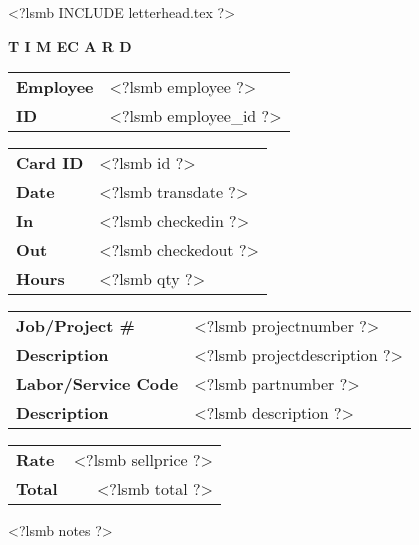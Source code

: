 \documentclass{scrartcl}
\begin{document}
\pagestyle{myheadings}
\thispagestyle{empty}

\fontsize{10pt}{12pt}\selectfont

<?lsmb INCLUDE letterhead.tex ?>

\centerline{\textbf{T I M E}\hspace{0.5cm}\textbf{C A R D}}

\vspace*{0.5cm}

\begin{tabular}[t]{ll}
  \textbf{Employee} & <?lsmb employee ?> \\
  \textbf{ID} & <?lsmb employee_id ?> \\
\end{tabular}
\hfill
\begin{tabular}[t]{ll}
  \textbf{Card ID} & <?lsmb id ?> \\
  \textbf{Date} & <?lsmb transdate ?> \\
  \textbf{In} & <?lsmb checkedin ?> \\
  \textbf{Out} & <?lsmb checkedout ?> \\
  \textbf{Hours} & <?lsmb qty ?> \\
\end{tabular}

\vspace{1cm}

\begin{tabular}[b]{ll}
  \textbf{Job/Project \#} & <?lsmb projectnumber ?> \\
  \textbf{Description} & <?lsmb projectdescription ?> \\
  \textbf{Labor/Service Code} & <?lsmb partnumber ?> \\
  \textbf{Description} & <?lsmb description ?> \\
\end{tabular}
\hfill
\begin{tabular}[b]{lr}
  \textbf{Rate} & <?lsmb sellprice ?> \\
  \textbf{Total} & <?lsmb total ?> \\
\end{tabular}
  
\vspace{0.3cm}

<?lsmb notes ?>
 
\end{document}
